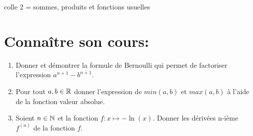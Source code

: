 \documentclass[a4paper,11pt]{article}
\theoremstyle{definition}
\begin{document}
	
	
	\begin{center}
		\Large \sc colle 2 = sommes, produits et fonctions usuelles
	\end{center}

\section*{Connaître son cours:}
\begin{enumerate}
	\item Donner et démontrer la formule de Bernoulli qui permet de factoriser l'expression $a^{n+1} - b^{n+1}$.
	\item Pour tout $a,b\in \mathbb{R}$ donner l'expression de $min(a,b)$ et $max(a,b)$ à l'aide de la fonction valeur absolue. 
	\item  Soient $n\in\mathbb{N}$ et la fonction $f:x\mapsto-\ln(x)$. Donner les dérivées  n-ième  $f^{(n)}$ de la fonction $f$.
\end{enumerate}
\end{document}
